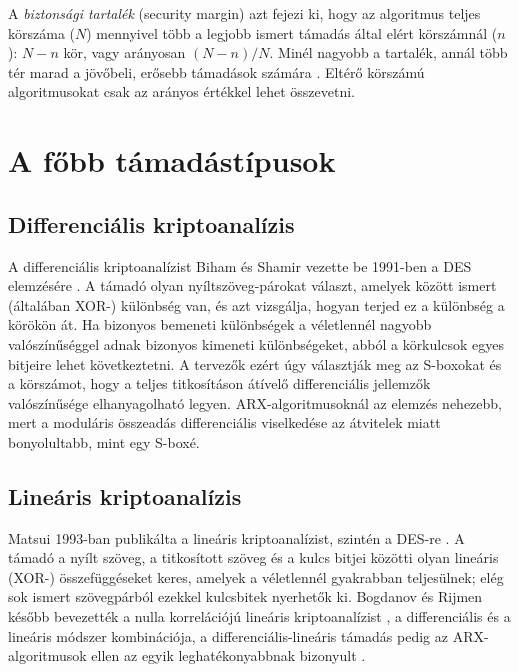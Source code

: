 \documentclass[a4paper,12pt]{report}
\theoremstyle{definition}
\theoremstyle{remark}
\begin{document}
A \emph{biztonsági tartalék} (security margin) azt fejezi ki, hogy az algoritmus teljes körszáma ($N$) mennyivel több a legjobb ismert támadás által elért körszámnál ($n$): $N - n$ kör, vagy arányosan $(N-n)/N$. Minél nagyobb a tartalék, annál több tér marad a jövőbeli, erősebb támadások számára \cite{Biryukov2017}. Eltérő körszámú algoritmusokat csak az arányos értékkel lehet összevetni.

\section{A főbb támadástípusok}\label{sec:tamadastipusok}

\subsection{Differenciális kriptoanalízis}

A differenciális kriptoanalízist Biham és Shamir vezette be 1991-ben a DES elemzésére \cite{Biham1991}. A támadó olyan nyíltszöveg-párokat választ, amelyek között ismert (általában XOR-) különbség van, és azt vizsgálja, hogyan terjed ez a különbség a körökön át. Ha bizonyos bemeneti különbségek a véletlennél nagyobb valószínűséggel adnak bizonyos kimeneti különbségeket, abból a körkulcsok egyes bitjeire lehet következtetni. A tervezők ezért úgy választják meg az S-boxokat és a körszámot, hogy a teljes titkosításon átívelő differenciális jellemzők valószínűsége elhanyagolható legyen. ARX-algoritmusoknál az elemzés nehezebb, mert a moduláris összeadás differenciális viselkedése az átvitelek miatt bonyolultabb, mint egy S-boxé.

\subsection{Lineáris kriptoanalízis}

Matsui 1993-ban publikálta a lineáris kriptoanalízist, szintén a DES-re \cite{Matsui1993}. A támadó a nyílt szöveg, a titkosított szöveg és a kulcs bitjei közötti olyan lineáris (XOR-) összefüggéseket keres, amelyek a véletlennél gyakrabban teljesülnek; elég sok ismert szövegpárból ezekkel kulcsbitek nyerhetők ki. Bogdanov és Rijmen később bevezették a nulla korrelációjú lineáris kriptoanalízist \cite{Bogdanov2014}, a differenciális és a lineáris módszer kombinációja, a differenciális-lineáris támadás pedig az ARX-algoritmusok ellen az egyik leghatékonyabbnak bizonyult \cite{Chen2023}.
\end{document}
